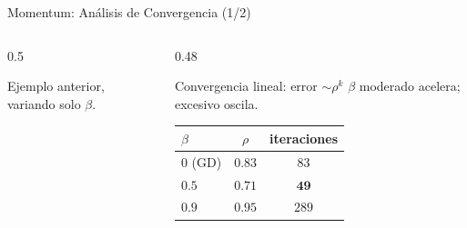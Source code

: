 \begin{frame}{Momentum: Análisis de Convergencia (1/2)}
\begin{columns}[T]
\begin{column}{0.5\textwidth}
            {\tiny Ejemplo anterior, variando solo $\beta$.\par}
        \end{column}
        \begin{column}{0.48\textwidth}
            \begin{alertblock}{Convergencia lineal: error $\sim\rho^k$}
                \footnotesize
                $\beta$ moderado acelera; excesivo oscila.
            \end{alertblock}
            \centering
            \small
            \begin{tabular}{l c c}
                \toprule
                $\beta$ & $\rho$ & iteraciones \\
                \midrule
                $0$ (GD) & $0.83$ & $83$ \\
                $0.5$ & $0.71$ & $\mathbf{49}$ \\
                $0.9$ & $0.95$ & $289$ \\
                \bottomrule
            \end{tabular}
        \end{column}
    \end{columns}
\end{frame}

